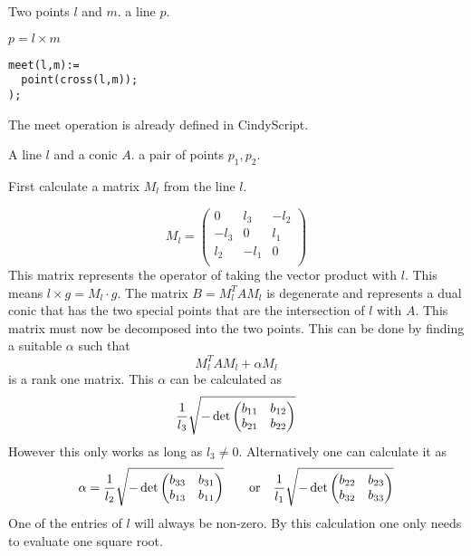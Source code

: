\documentclass[11pt]{article}
\newcounter{subsubsubsection}[subsubsection]
\begin{document}


\medskip
{} Two points $l$ and $m$.  a line $p$.


\medskip
{} $p=l\times m$

\medskip
{} 
\begin{verbatim}
meet(l,m):=
  point(cross(l,m));
);  
\end{verbatim}

\medskip
{} 
The meet operation is already defined in CindyScript.




\medskip
{} A line $l$ and a conic $A$.  a pair of points $p_1,p_2$.

\medskip
{}
First calculate a matrix $M_l$ from the line $l$.

\[
M_l=\begin{pmatrix}
0&l_3&-l_2\\
-l_3&0&l_1\\
l_2&-l_1&0\\
\end{pmatrix}
\]
This matrix represents the operator of taking the vector product with $l$. This means
$l\times g=M_l\cdot g$. 
The matrix $B=M_l^TAM_l$ is degenerate and represents a dual conic that has the two special points that are the intersection of $l$ with $A$.
This matrix must now be  decomposed into the two points. This can be done by finding a suitable $\alpha$ such that
\[
M_l^TAM_l+\alpha M_l
\]
is a rank one matrix.
This $\alpha$ can be calculated as
\[{1\over l_3}
\sqrt{
-\det
\begin{pmatrix}
b_{11}&b_{12}\\
b_{21}&b_{22}
\end{pmatrix}
}
\]
However this only works as long as $l_3\neq 0$. 
Alternatively one can calculate it as
\[\alpha={1\over l_2}
\sqrt{
-\det
\begin{pmatrix}
b_{33}&b_{31}\\
b_{13}&b_{11}
\end{pmatrix}
}
\quad\mathrm{\quad or\quad}
{1\over l_1}
\sqrt{
-\det
\begin{pmatrix}
b_{22}&b_{23}\\
b_{32}&b_{33}
\end{pmatrix}
}
\]
One of the entries of $l$ will always be non-zero.
By this calculation one only needs to evaluate one square root.
\end{document}
